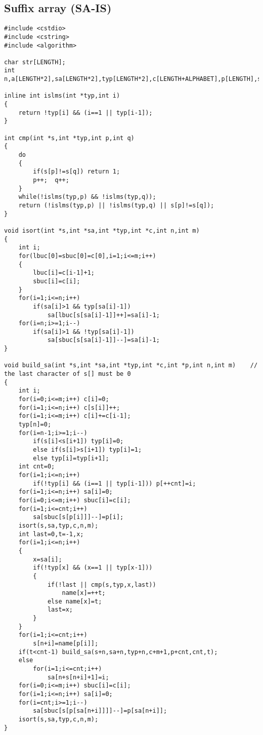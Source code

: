 \documentclass[a4paper,12pt]{article}
\begin{document}
\subsection{Suffix array (SA-IS)}
\begin{lstlisting}
#include <cstdio>
#include <cstring>
#include <algorithm>

char str[LENGTH];
int n,a[LENGTH*2],sa[LENGTH*2],typ[LENGTH*2],c[LENGTH+ALPHABET],p[LENGTH],sbuc[LENGTH+ALPHABET],lbuc[LENGTH+ALPHABET],name[LENGTH],hei[LENGTH],rk[LENGTH];

inline int islms(int *typ,int i)
{
    return !typ[i] && (i==1 || typ[i-1]);
}

int cmp(int *s,int *typ,int p,int q)
{
    do
    {
        if(s[p]!=s[q]) return 1;
        p++;  q++;
    }
    while(!islms(typ,p) && !islms(typ,q));
    return (!islms(typ,p) || !islms(typ,q) || s[p]!=s[q]);
}

void isort(int *s,int *sa,int *typ,int *c,int n,int m)
{
    int i;
    for(lbuc[0]=sbuc[0]=c[0],i=1;i<=m;i++)
    {
        lbuc[i]=c[i-1]+1;
        sbuc[i]=c[i];
    }
    for(i=1;i<=n;i++)
        if(sa[i]>1 && typ[sa[i]-1])
            sa[lbuc[s[sa[i]-1]]++]=sa[i]-1;
    for(i=n;i>=1;i--)
        if(sa[i]>1 && !typ[sa[i]-1])
            sa[sbuc[s[sa[i]-1]]--]=sa[i]-1;
}

void build_sa(int *s,int *sa,int *typ,int *c,int *p,int n,int m)    // the last character of s[] must be 0
{
    int i;
    for(i=0;i<=m;i++) c[i]=0;
    for(i=1;i<=n;i++) c[s[i]]++;
    for(i=1;i<=m;i++) c[i]+=c[i-1];
    typ[n]=0;
    for(i=n-1;i>=1;i--)
        if(s[i]<s[i+1]) typ[i]=0;
        else if(s[i]>s[i+1]) typ[i]=1;
        else typ[i]=typ[i+1];
    int cnt=0;
    for(i=1;i<=n;i++)
        if(!typ[i] && (i==1 || typ[i-1])) p[++cnt]=i;
    for(i=1;i<=n;i++) sa[i]=0;
    for(i=0;i<=m;i++) sbuc[i]=c[i];
    for(i=1;i<=cnt;i++)
        sa[sbuc[s[p[i]]]--]=p[i];
    isort(s,sa,typ,c,n,m);
    int last=0,t=-1,x;
    for(i=1;i<=n;i++)
    {
        x=sa[i];
        if(!typ[x] && (x==1 || typ[x-1]))
        {
            if(!last || cmp(s,typ,x,last))
                name[x]=++t;
            else name[x]=t;
            last=x;
        }
    }
    for(i=1;i<=cnt;i++)
        s[n+i]=name[p[i]];
    if(t<cnt-1) build_sa(s+n,sa+n,typ+n,c+m+1,p+cnt,cnt,t);
    else
        for(i=1;i<=cnt;i++)
            sa[n+s[n+i]+1]=i;
    for(i=0;i<=m;i++) sbuc[i]=c[i];
    for(i=1;i<=n;i++) sa[i]=0;
    for(i=cnt;i>=1;i--)
        sa[sbuc[s[p[sa[n+i]]]]--]=p[sa[n+i]];
    isort(s,sa,typ,c,n,m);
}


\end{lstlisting}
\end{document}
